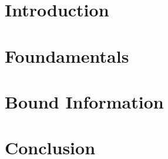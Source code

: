 \documentclass[titlepage]{report}
\begin{document}

\tableofcontents

\chapter{Introduction}

		
\chapter{Foundamentals}

		
\chapter{Bound Information}

	
\chapter{Conclusion}


%
\printbibliography
\end{document}
